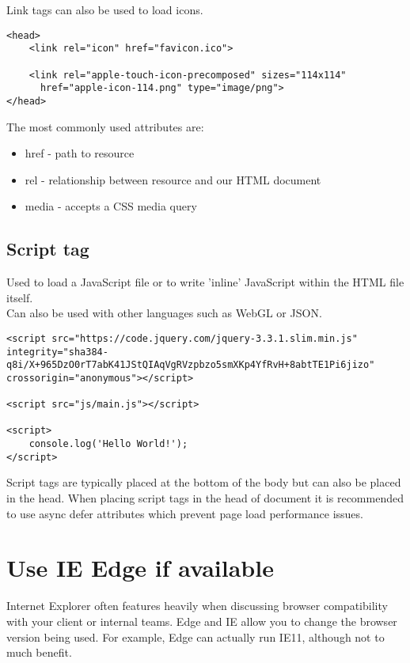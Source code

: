 Link tags can also be used to load icons.

\begin{verbatim}
<head>
    <link rel="icon" href="favicon.ico">

    <link rel="apple-touch-icon-precomposed" sizes="114x114"
      href="apple-icon-114.png" type="image/png">
</head>
\end{verbatim}

The most commonly used attributes are:

\begin{itemize}[leftmargin=*]
    \item href - path to resource
    \item rel - relationship between resource and our HTML document
    \item media - accepts a CSS media query
\end{itemize}

\subsection{Script tag}

Used to load a JavaScript file or to write 'inline' JavaScript within the HTML file itself.
\\

Can also be used with other languages such as WebGL or JSON.

\begin{verbatim}
<script src="https://code.jquery.com/jquery-3.3.1.slim.min.js" integrity="sha384-q8i/X+965DzO0rT7abK41JStQIAqVgRVzpbzo5smXKp4YfRvH+8abtTE1Pi6jizo" crossorigin="anonymous"></script>

<script src="js/main.js"></script>

<script>
    console.log('Hello World!');
</script>
\end{verbatim}

Script tags are typically placed at the bottom of the body but can also be placed in the head. When placing script tags in the head of document it is recommended to use async defer attributes which prevent page load performance issues.

\section{Use IE Edge if available}

Internet Explorer often features heavily when discussing browser compatibility with your client or internal teams. Edge and IE allow you to change the browser version being used. For example, Edge can actually run IE11, although not to much benefit.
\\

